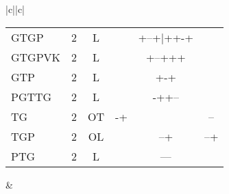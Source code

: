 \documentclass[table,
12pt, %
a4paper, %
oneside, %
headinclude,footinclude, %
BCOR5mm, %
]{scrartcl}
\begin{document}
\begin{table}[htbp]
\begin{adjustbox}{width=\textwidth,center}
\begin{tabular}{|c||c|}
\begin{tabular}{l ccccc}
        GTGP         & 2   & L           &        & +--+|++-+ &       \\
        GTGPVK       & 2   & L           &        & +--+++    &       \\
        GTP          & 2   & L           &        & +-+       &       \\
        PGTTG        & 2   & L           &        & -++--     &       \\
        TG           & 2   & OT          & -+     &           & --    \\
        TGP          & 2   & OL          &        & --+       & --+   \\
        PTG          & 2   & L           &        & ---       &       \\
      \end{tabular} &


\end{tabular}
\end{adjustbox}
\end{table}
\end{document}
